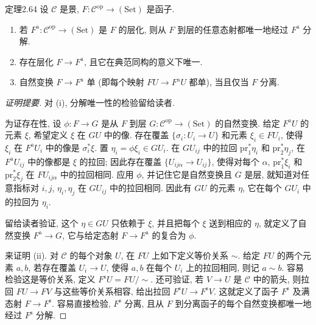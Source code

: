 \begin{origstatement}{定理}{2.64}\label{ch02:thm264}
设 $\mathcal C$ 是景, $F:\mathcal C^{\mathrm{op}}\to(\mathrm{Set})$ 是函子.
\begin{enumerate}
\item[(i)] 若 $F^{\mathrm a}:\mathcal C^{\mathrm{op}}\to(\mathrm{Set})$ 是 $F$ 的层化, 则从 $F$ 到层的任意态射都唯一地经过 $F^{\mathrm a}$ 分解.
\item[(ii)] 存在层化 $F\to F^{\mathrm a}$, 且它在典范同构的意义下唯一.
\item[(iii)] 自然变换 $F\to F^{\mathrm a}$ 单 (即每个映射 $FU\to F^{\mathrm a}U$ 都单), 当且仅当 $F$ 分离.
\end{enumerate}
\end{origstatement}
\begin{proof}[证明提要]
对 (i), 分解唯一性的检验留给读者.

为证存在性, 设 $\phi:F\to G$ 是从 $F$ 到层 $G:\mathcal C^{\mathrm{op}}\to(\mathrm{Set})$ 的自然变换. 给定 $F^{\mathrm a}U$ 的元素 $\xi$, 希望定义 $\xi$ 在 $GU$ 中的像. 存在覆盖 $\{\sigma_i:U_i\to U\}$ 和元素 $\xi_i\in FU_i$, 使得 $\xi_i$ 在 $F^{\mathrm a}U_i$ 中的像是 $\sigma_i^*\xi$. 置 $\eta_i=\phi\xi_i\in GU_i$. 在 $GU_{ij}$ 中的拉回 $\mathrm{pr}_1^*\eta_i$ 和 $\mathrm{pr}_2^*\eta_j$, 在 $F^{\mathrm a}U_{ij}$ 中的像都是 $\xi$ 的拉回; 因此存在覆盖 $\{U_{ij\alpha}\to U_{ij}\}$, 使得对每个 $\alpha$, $\mathrm{pr}_1^*\xi_i$ 和 $\mathrm{pr}_2^*\xi_j$ 在 $FU_{ij\alpha}$ 中的拉回相同.
应用 $\phi$, 并记住它是自然变换且
$G$ 是层, 就知道对任意指标对 $i,j$, $\eta_i,\eta_j$ 在 $GU_{ij}$ 中的拉回相同. 因此有 $GU$ 的元素 $\eta$, 它在每个 $GU_i$ 中的拉回为 $\eta_i$.

留给读者验证, 这个 $\eta\in GU$ 只依赖于 $\xi$, 并且把每个 $\xi$ 送到相应的 $\eta$, 就定义了自然变换 $F^{\mathrm a}\to G$, 它与给定态射 $F\to F^{\mathrm a}$ 的复合为 $\phi$.

来证明 (ii). 对 $\mathcal C$ 的每个对象 $U$, 在 $FU$ 上如下定义等价关系 $\sim$. 给定 $FU$ 的两个元素 $a,b$, 若存在覆盖 $U_i\to U$, 使得 $a,b$ 在每个 $U_i$ 上的拉回相同, 则记 $a\sim b$. 容易检验这是等价关系, 定义 $F^{\mathrm s}U=FU/{\sim}$. 还可验证, 若 $V\to U$ 是 $\mathcal C$ 中的箭头, 则拉回 $FU\to FV$ 与这些等价关系相容, 给出拉回 $F^{\mathrm s}U\to F^{\mathrm s}V$. 这就定义了函子 $F^{\mathrm s}$ 及满态射 $F\to F^{\mathrm s}$. 容易直接检验, $F^{\mathrm s}$ 分离, 且从 $F$ 到分离函子的每个自然变换都唯一地经过 $F^{\mathrm s}$ 分解.


\end{proof}
